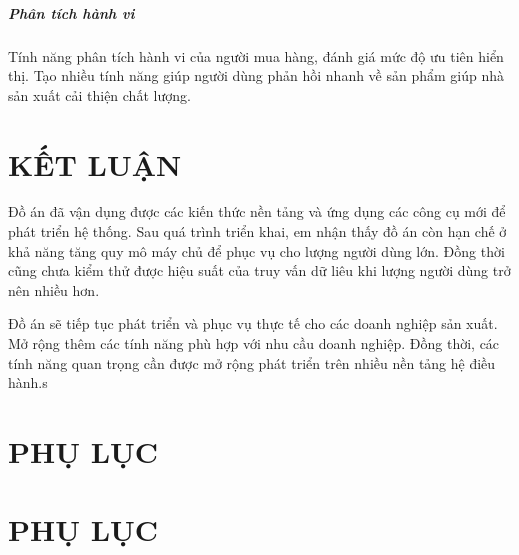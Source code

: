 \documentclass[11pt]{report}
\begin{document}
\paragraph{Phân tích hành vi} Tính năng phân tích hành vi của người mua hàng, đánh giá mức độ ưu tiên hiển thị. Tạo nhiều tính năng giúp người dùng phản hồi nhanh về sản phẩm giúp nhà sản xuất cải thiện chất lượng.

\chapter*{KẾT LUẬN}
Đồ án đã vận dụng được các kiến thức nền tảng và ứng dụng các công cụ mới để phát triển hệ thống. Sau quá trình triển khai, em nhận thấy đồ án còn hạn chế ở khả năng tăng quy mô máy chủ để phục vụ cho lượng người dùng lớn. Đồng thời cũng chưa kiểm thử được hiệu suất của truy vấn dữ liêu khi lượng người dùng trở nên nhiều hơn.

Đồ án sẽ tiếp tục phát triển và phục vụ thực tế cho các doanh nghiệp sản xuất. Mở rộng thêm các tính năng phù hợp với nhu cầu doanh nghiệp. Đồng thời, các tính năng quan trọng cần được mở rộng phát triển trên nhiều nền tảng hệ điều hành.s




\chapter*{PHỤ LỤC}

\chapter*{PHỤ LỤC}
\end{document}
